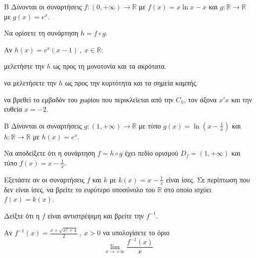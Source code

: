 \begin{thema}{Β}
Δίνονται οι συναρτήσεις $f:(0,+\infty)\to\mathbb{R}$ με $f(x)=x\ln{x}-x$ και $g:\mathbb{R}\to\mathbb{R}$ με $g(x)=e^x$.
\begin{erwthma}
\item Να ορίσετε τη συνάρτηση $h=f\circ g$.
\end{erwthma}
Αν $h(x)=e^x(x-1)\ ,\ x\in\mathbb{R}$:
\begin{erwthma}[resume]
\item μελετήστε την $h$ ως προς τη μονοτονία και τα ακρότατα.
\item να μελετήσετε την $h$ ως προς την κυρτότητα και τα σημεία καμπής.
\item να βρεθεί το εμβαδόν του χωρίου που περικλείεται από την $C_h$, τον άξονα $x'x$ και την ευθεία $x=-2$.
\end{erwthma}
\end{thema}
\begin{thema}{Β}
Δίνονται οι συναρτήσεις $g:(1,+\infty)\to\mathbb{R}$ με τύπο $g(x)=\ln{\left(x-\frac{1}{x}\right)}$ και $h:\mathbb{R}\to\mathbb{R}$ με $h(x)=e^x$.
\begin{erwthma}
\item Να αποδείξετε ότι η συνάρτηση $f=h\circ g$ έχει πεδίο ορισμού $D_f=(1,+\infty)$ και τύπο $f(x)=x-\frac{1}{x}$.
\item Εξετάστε αν οι συναρτήσεις $f$ και $k$ με $k(x)=x-\frac{1}{x}$ είναι ίσες. Σε περίπτωση που δεν είναι ίσες, να βρείτε το ευρύτερο υποσύνολο του $\mathbb{R}$ στο οποίο ισχύει $f(x)=k(x)$.
\item Δείξτε ότι η $f$ είναι αντιστρέψιμη και βρείτε την $f^{-1}$.
\item Αν $f^{-1}(x)=\frac{x+\sqrt{x^2+4}}{2}\ ,\ x>0$ να υπολογίσετε το όριο
\[ \lim\limits_{x\to+\infty}{\frac{f^{-1}(x)}{x}} \]
\end{erwthma}
\end{thema}

